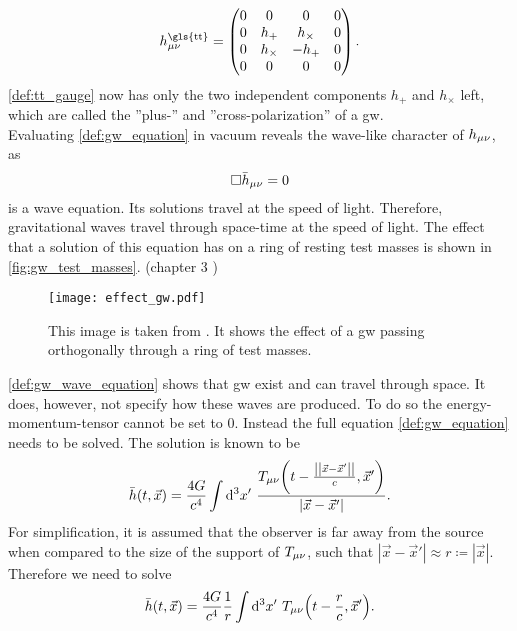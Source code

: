 \begin{equation}\label{def:tt_gauge}
h_\mn^\text{\gls{tt}}=
\begin{pmatrix}
	0 & 0         & 0        & 0\\
	0 & h_+       & h_\times & 0\\
	0 & h_\times & -h_+      & 0\\
	0 & 0         & 0        & 0\\
\end{pmatrix}.
\end{equation}
\eqref{def:tt_gauge} now has only the two independent components $h_+$ and $h_\times$ left, which are called the ''plus-'' and ''cross-polarization'' of a \gls{gw}.\medskip\\
Evaluating \eqref{def:gw_equation} in vacuum reveals the wave-like character of $h_{\mu\nu}$, as
\begin{equation}\label{def:gw_wave_equation}
\Box\bar{h}_{\mu\nu} =0
\end{equation}
is a wave equation. Its solutions travel at the speed of light. Therefore, gravitational waves travel through space-time at the speed of light. The effect that a solution of this equation has on a ring of resting test masses is shown in \autoref{fig:gw_test_masses}. (chapter 3 \cite{bachelor})\medskip\\
\begin{figure}
\centering
\texttt{[image: effect\_gw.pdf]}
\caption[Effect of GW on ring of test masses]{This image is taken from \cite{bachelor}. It shows the effect of a \gls{gw} passing orthogonally through a ring of test masses.}\label{fig:gw_test_masses}
\end{figure}
\eqref{def:gw_wave_equation} shows that \gls{gw} exist and can travel through space. It does, however, not specify how these waves are produced. To do so the energy-momentum-tensor cannot be set to $0$. Instead the full equation \eqref{def:gw_equation} needs to be solved. The solution is known to be
\begin{equation}
\bar{h}\lr{t, \vec{x}}=\frac{4 G}{c^4}\int\Diff{3}x'\ \frac{T_\mn\lr{t-\frac{\norm{\vec{x}-\vec{x}'}}{c},\vec{x}'}}{\left|\vec{x}-\vec{x}'\right|}.
\end{equation}
For simplification, it is assumed that the observer is far away from the source when compared to the size of the support of $T_{\mu\nu}$, such that $\left|\vec{x}-\vec{x}'\right|\approx r\coloneqq\left|\vec{x}\right|$. Therefore we need to solve
\begin{equation}
\bar{h}\lr{t, \vec{x}}=\frac{4 G}{c^4}\frac{1}{r}\int\Diff{3}x'\ T_\mn\lr{t-\frac{r}{c},\vec{x}'}.
\end{equation}
